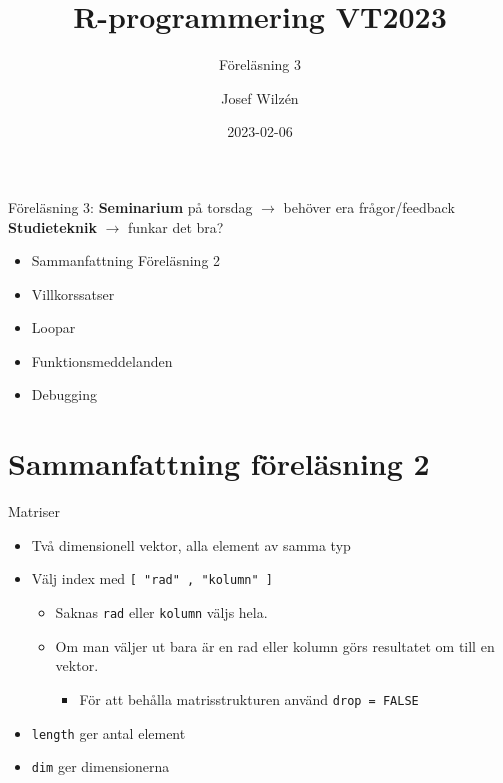 \documentclass[
  11pt,
  ignorenonframetext,
]{beamer}
\title{R-programmering VT2023}
\subtitle{Föreläsning 3}
\author{Josef Wilzén}
\date{2023-02-06}
\institute{Linköpings Universitet}
\providecommand{\tightlist}{%
  \setlength{\itemsep}{0pt}\setlength{\parskip}{0pt}}
\begin{document}
\frame{\titlepage}


\begin{frame}{Föreläsning 3:}
\protect\hypertarget{fuxf6reluxe4sning-3}{}
\textbf{Seminarium} på torsdag $\rightarrow$ behöver era frågor/feedback
\textbf{Studieteknik}  $\rightarrow$ funkar det bra?

\begin{itemize}
\tightlist
\item
  Sammanfattning Föreläsning 2
\item
  Villkorssatser
\item
  Loopar
\item
  Funktionsmeddelanden
\item
  Debugging
\end{itemize}
\end{frame}

\hypertarget{sammanfattning-fuxf6reluxe4sning-2}{%
\section{Sammanfattning föreläsning
2}\label{sammanfattning-fuxf6reluxe4sning-2}}


\begin{frame}{Matriser}
\protect\hypertarget{matriser}{}
\begin{itemize}
\tightlist
\item
  Två dimensionell vektor, alla element av samma typ
\item
  Välj index med \texttt{[ "rad" , "kolumn" ]}

  \begin{itemize}
  \tightlist
  \item
    Saknas \texttt{rad} eller \texttt{kolumn} väljs hela.
  \item
    Om man väljer ut bara är en rad eller kolumn görs resultatet om till
    en vektor.

    \begin{itemize}
    \tightlist
    \item
      För att behålla matrisstrukturen använd \texttt{drop = FALSE}
    \end{itemize}
  \end{itemize}
\item
  \texttt{length} ger antal element
\item
  \texttt{dim} ger dimensionerna
\end{itemize}
\end{frame}
\end{document}

